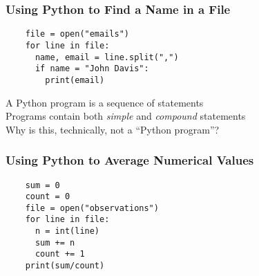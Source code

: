 \documentclass[14pt,aspectratio=169]{beamer}
\begin{document}
%
\begin{frame}[fragile]
  \frametitle{Using Python to Find a Name in a File}
  \normalsize
  \hspace*{-.65in}
  \begin{minipage}{6in}
    \vspace*{.25in}
    \begin{verbatim}
    file = open("emails")
    for line in file:
      name, email = line.split(",")
      if name = "John Davis":
        print(email)
    \end{verbatim}
  \end{minipage}
  \vspace*{.25in}
  \begin{center}
    \normalsize \noindent A Python program is a sequence of statements \\
    \normalsize \noindent Programs contain both {\em simple} and {\em compound} statements \\
    \normalsize \noindent Why is this, technically, not a ``Python program''? \\
  \end{center}
\end{frame}

%
\begin{frame}[fragile]
  \frametitle{Using Python to Average Numerical Values}
  \hspace*{-.6in}
  \begin{minipage}{6in}
    \begin{verbatim}
    sum = 0
    count = 0
    file = open("observations")
    for line in file:
      n = int(line)
      sum += n
      count += 1
    print(sum/count)
    \end{verbatim}
  \end{minipage}
\end{frame}
\end{document}
